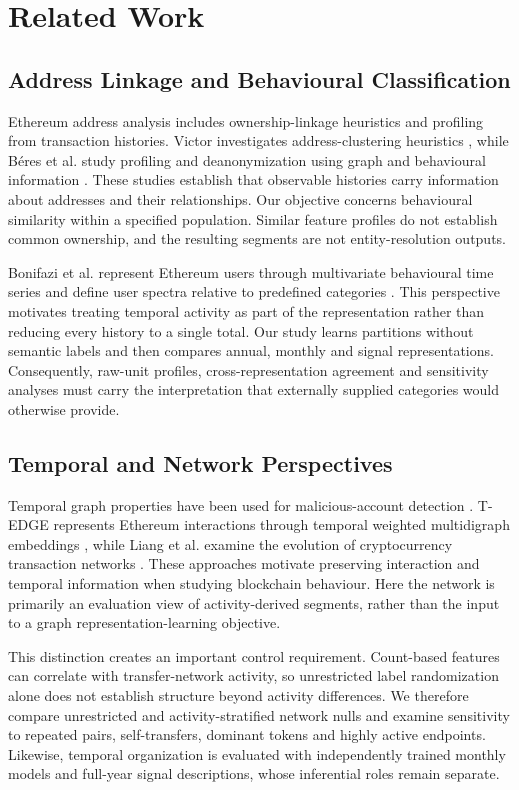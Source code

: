 \documentclass[journal,letterpaper]{IEEEtran}
\begin{document}
\section{Related Work}
\subsection{Address Linkage and Behavioural Classification}
Ethereum address analysis includes ownership-linkage heuristics and profiling from transaction histories. Victor investigates address-clustering heuristics \cite{victor2020address}, while B\'{e}res et al. study profiling and deanonymization using graph and behavioural information \cite{beres2021blockchain}. These studies establish that observable histories carry information about addresses and their relationships. Our objective concerns behavioural similarity within a specified population. Similar feature profiles do not establish common ownership, and the resulting segments are not entity-resolution outputs.

Bonifazi et al. represent Ethereum users through multivariate behavioural time series and define user spectra relative to predefined categories \cite{bonifazi2022userspectra}. This perspective motivates treating temporal activity as part of the representation rather than reducing every history to a single total. Our study learns partitions without semantic labels and then compares annual, monthly and signal representations. Consequently, raw-unit profiles, cross-representation agreement and sensitivity analyses must carry the interpretation that externally supplied categories would otherwise provide.

\subsection{Temporal and Network Perspectives}
Temporal graph properties have been used for malicious-account detection \cite{agarwal2021temporal}. T-EDGE represents Ethereum interactions through temporal weighted multidigraph embeddings \cite{tedge2020}, while Liang et al. examine the evolution of cryptocurrency transaction networks \cite{liang2018evolutionary}. These approaches motivate preserving interaction and temporal information when studying blockchain behaviour. Here the network is primarily an evaluation view of activity-derived segments, rather than the input to a graph representation-learning objective.

This distinction creates an important control requirement. Count-based features can correlate with transfer-network activity, so unrestricted label randomization alone does not establish structure beyond activity differences. We therefore compare unrestricted and activity-stratified network nulls and examine sensitivity to repeated pairs, self-transfers, dominant tokens and highly active endpoints. Likewise, temporal organization is evaluated with independently trained monthly models and full-year signal descriptions, whose inferential roles remain separate.
\end{document}
